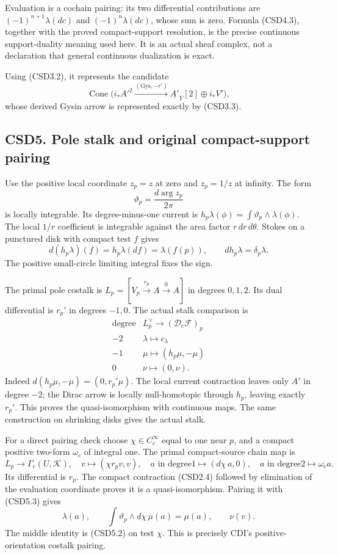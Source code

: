 Evaluation is a cochain pairing: its two differential contributions are
\((-1)^{n+1}\lambda(dc)\) and \((-1)^n\lambda(dc)\), whose sum is zero.
Formula (CSD4.3), together with the proved compact-support resolution,
is the precise continuous support-duality meaning used here. It is an
actual sheaf complex, not a declaration that general continuous
dualization is exact.

Using (CSD3.2), it represents the candidate \[
\operatorname{Cone}\bigl(i_*A'^2
\xrightarrow{(\mathrm{Gys},-r')}
\underline{A'}_Y[2]\oplus i_*V'\bigr),
\tag{CSD4.4}
\] whose derived Gysin arrow is represented exactly by (CSD3.3).

\subsection{CSD5. Pole stalk and original compact-support
pairing}\label{csd5.-pole-stalk-and-original-compact-support-pairing}

Use the positive local coordinate \(z_p=z\) at zero and \(z_p=1/z\) at
infinity. The form \[
\vartheta_p=\frac{d\arg z_p}{2\pi}
\tag{CSD5.1}
\] is locally integrable. Its degree-minus-one current is
\(h_p\lambda(\phi)=\int\vartheta_p\wedge\lambda(\phi)\). The local
\(1/r\) coefficient is integrable against the area factor
\(r\,dr\,d\theta\). Stokes on a punctured disk with compact test \(f\)
gives \[
d(h_p\lambda)(f)=h_p\lambda(df)=\lambda(f(p)),
\qquad dh_p\lambda=\delta_p\lambda.
\tag{CSD5.2}
\] The positive small-circle limiting integral fixes the sign.

The primal pole costalk is
\(L_p=[V_p\xrightarrow{r_p}A\xrightarrow0 A]\) in degrees \(0,1,2\). Its
dual differential is \(r_p'\) in degrees \(-1,0\). The actual stalk
comparison is \[
\begin{array}{c|c}
\text{degree}&L_p^\vee\longrightarrow(\mathscr D_c\mathscr F)_p\\ \hline
-2&\lambda\mapsto c_\lambda\\
-1&\mu\mapsto(h_p\mu,-\mu)\\
0&\nu\mapsto(0,\nu).
\end{array}
\tag{CSD5.3}
\] Indeed \(d(h_p\mu,-\mu)=(0,r_p'\mu)\). The local current contraction
leaves only \(A'\) in degree \(-2\); the Dirac arrow is locally
null-homotopic through \(h_p\), leaving exactly \(r_p'\). This proves
the quasi-isomorphism with continuous maps. The same construction on
shrinking disks gives the actual stalk.

For a direct pairing check choose \(\chi\in C_c^\infty\) equal to one
near \(p\), and a compact positive two-form \(\omega_c\) of integral
one. The primal compact-source chain map is \[
L_p\longrightarrow\Gamma_c(U,\mathscr K),\quad
v\mapsto(\chi r_pv,v),\quad
a\text{ in degree1}\mapsto(d\chi\,a,0),\quad
a\text{ in degree2}\mapsto\omega_c a.
\tag{CSD5.4}
\] Its differential is \(r_p\). The compact contraction (CSD2.4)
followed by elimination of the evaluation coordinate proves it is a
quasi-isomorphism. Pairing it with (CSD5.3) gives \[
\lambda(a),\qquad
\int\vartheta_p\wedge d\chi\,\mu(a)=\mu(a),\qquad
\nu(v).
\tag{CSD5.5}
\] The middle identity is (CSD5.2) on test \(\chi\). This is precisely
CDI's positive-orientation costalk pairing.

